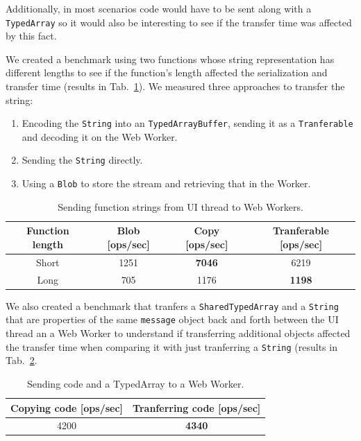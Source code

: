 \documentclass[runningheads,a4paper]{llncs}
\begin{document}
Additionally, in most scenarios code would have to be sent along with a \verb+TypedArray+ so it would also be interesting to see if the transfer time was affected by this fact.

We created a benchmark using two functions whose string representation has different lengths to see if the function's length affected the serialization and transfer time (results in Tab.~\ref{tab:send-function}). We measured three approaches to transfer the string:
\begin{enumerate}
  \item Encoding the \verb+String+ into an \verb+TypedArrayBuffer+, sending it as a \verb+Tranferable+ and decoding it on the Web Worker.
  \item Sending the \verb+String+ directly.
  \item Using a \verb+Blob+ to store the stream and retrieving that in the Worker.
\end{enumerate}

\begin{table}
  \centering
  \begin{tabular}{|c|c|c|c|}
    \hline
    Function length & Blob [ops/sec] & Copy [ops/sec] & Tranferable [ops/sec] \\
    \hline
    Short & 1251 & \textbf{7046} & 6219 \\
    Long & 705 & 1176 & \textbf{1198} \\
    \hline
  \end{tabular}
  \caption{Sending function strings from UI thread to Web Workers.}
  \label{tab:send-function}
\end{table}

We also created a benchmark that tranfers a \verb+SharedTypedArray+ and a \verb+String+ that are properties of the same \verb+message+ object back and forth between the UI thread an a Web Worker to understand if transferring additional objects affected the transfer time when comparing it with just tranferring a \verb+String+ (results in Tab.~\ref{tab:send-function-and-array}.
\begin{table}
  \centering
  \begin{tabular}{|c|c|}
    \hline
    Copying code [ops/sec] & Tranferring code [ops/sec] \\
    \hline
    4200 & \textbf{4340} \\
    \hline
  \end{tabular}
  \caption{Sending code and a TypedArray to a Web Worker.}
  \label{tab:send-function-and-array}
\end{table}
\end{document}
